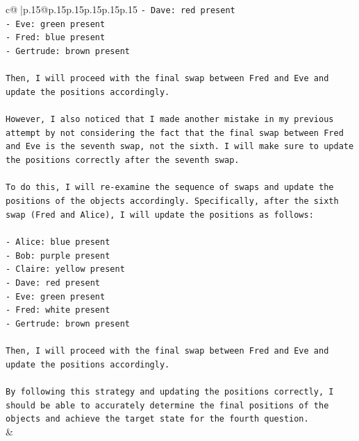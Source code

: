 \documentclass{article}
\begin{document}
{\begin{supertabular}{c@{$\;$}|p{.15\linewidth}@{}p{.15\linewidth}p{.15\linewidth}p{.15\linewidth}p{.15\linewidth}p{.15\linewidth}}
{{{\texttt{{-} Dave: red present} \\
\texttt{{-} Eve: green present} \\
\texttt{{-} Fred: blue present} \\
\texttt{{-} Gertrude: brown present} \\
\\ 
\texttt{Then, I will proceed with the final swap between Fred and Eve and update the positions accordingly.} \\
\\ 
\texttt{However, I also noticed that I made another mistake in my previous attempt by not considering the fact that the final swap between Fred and Eve is the seventh swap, not the sixth. I will make sure to update the positions correctly after the seventh swap.} \\
\\ 
\texttt{To do this, I will re{-}examine the sequence of swaps and update the positions of the objects accordingly. Specifically, after the sixth swap (Fred and Alice), I will update the positions as follows:} \\
\\ 
\texttt{{-} Alice: blue present} \\
\texttt{{-} Bob: purple present} \\
\texttt{{-} Claire: yellow present} \\
\texttt{{-} Dave: red present} \\
\texttt{{-} Eve: green present} \\
\texttt{{-} Fred: white present} \\
\texttt{{-} Gertrude: brown present} \\
\\ 
\texttt{Then, I will proceed with the final swap between Fred and Eve and update the positions accordingly.} \\
\\ 
\texttt{By following this strategy and updating the positions correctly, I should be able to accurately determine the final positions of the objects and achieve the target state for the fourth question.} \\
            }
        }
    }
    & \\ \\

\end{supertabular}
}
\end{document}
